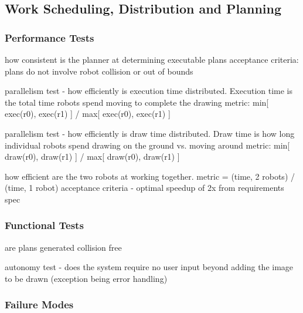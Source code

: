 
\subsection{Work Scheduling, Distribution and Planning}
\label{sec:verification_sdp}


\subsubsection{Performance Tests}
\label{sec:sdp_pt}

how consistent is the planner at determining executable plans
acceptance criteria: plans do not involve robot collision or out of bounds

parallelism test - how efficiently is execution time distributed. Execution time is the total time robots spend moving to complete the drawing
metric: min[ exec(r0), exec(r1) ] / max[ exec(r0), exec(r1) ]


parallelism test - how efficiently is draw time distributed. Draw time is how long individual robots spend drawing on the ground vs. moving around
metric: min[ draw(r0), draw(r1) ] / max[ draw(r0), draw(r1) ]

how efficient are the two robots at working together.
metric = (time, 2 robots) / (time, 1 robot)
acceptance criteria - optimal speedup of 2x from requirements spec

\subsubsection{Functional Tests}
\label{sec:sdp_ft}

are plans generated collision free

autonomy test - does the system require no user input beyond adding the image to be drawn (exception being error handling)



\subsubsection{Failure Modes}
\label{sec:sdp_fm}

